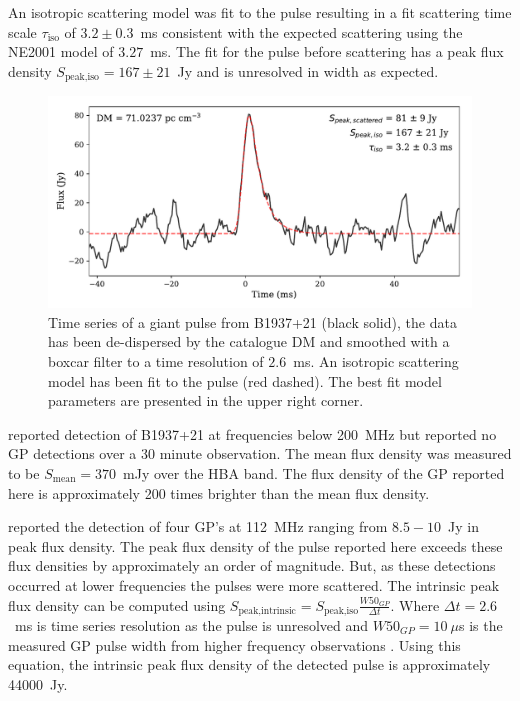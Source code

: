 \documentclass[RNAAS]{aastex62}
\begin{document}
An isotropic scattering model \citep{2017MNRAS.470.2659G} was fit to the pulse
resulting in a fit scattering time scale $\tau_{\textrm{iso}}$ of $3.2 \pm
0.3$~ms consistent with the expected scattering using the NE2001
\citep{2002astro.ph..7156C} model of $3.27$~ms. The fit for the pulse before
scattering has a peak flux density $S_{\textrm{peak,iso}} =167 \pm 21$~Jy and is
unresolved in width as expected.

\begin{figure}
	\centering
    \includegraphics[width=0.75\linewidth]{figures/B1937+21_pulse.pdf}
    \caption{Time series of a giant pulse from B1937+21 (black solid), the data
    has been de-dispersed by the catalogue DM and smoothed with a boxcar filter
    to a time resolution of $2.6$~ms. An isotropic scattering model has been fit
    to the pulse (red dashed). The best fit model parameters are presented in
    the upper right corner.
    }
    \label{fig:pulse}
\end{figure}

\cite{2016A&A...585A.128K} reported detection of B1937+21 at frequencies below
200~MHz but reported no GP detections over a 30 minute observation. The mean
flux density was measured to be $S_{\textrm{mean}} = 370$~mJy over the HBA band.
The flux density of the GP reported here is approximately 200 times brighter
than the mean flux density.

\cite{2002AstL...28...21K} reported the detection of four GP's at 112~MHz
ranging from $8.5 - 10$~Jy in peak flux density. The peak flux density of the
pulse reported here exceeds these flux densities by approximately an order of
magnitude. But, as these detections occurred at lower frequencies the pulses
were more scattered.  The intrinsic peak flux density can be computed using
$S_{\textrm{peak,intrinsic}} = S_{\textrm{peak,iso}} \frac{W50_{GP}}{\Delta t}$.
Where $\Delta t=2.6$~ms is time series resolution as the pulse is unresolved and
$W50_{GP} = 10~\mu$s is the measured GP pulse width from higher frequency
observations \citep{2000ApJ...535..365K}. Using this equation, the intrinsic
peak flux density of the detected pulse is approximately 44000~Jy.
\end{document}
